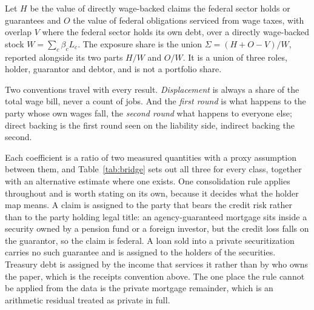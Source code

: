 \begin{definition}
\label{def:exposure}
Let $H$ be the value of directly wage-backed claims the federal sector holds or guarantees and
$O$ the value of federal obligations serviced from wage taxes, with overlap $V$ where the federal
sector holds its own debt, over a directly wage-backed stock $W = \sum_c \beta_c L_c$. The
exposure share is the union $\Sigma = (H + O - V)/W$, reported alongside its two parts $H/W$ and
$O/W$. It is a union of three roles, holder, guarantor and debtor, and is not a portfolio share.
\end{definition}

Two conventions travel with every result. \emph{Displacement} is always a share of the total wage
bill, never a count of jobs. And the \emph{first round} is what happens to the party whose own
wages fall, the \emph{second round} what happens to everyone else; direct backing is the first
round seen on the liability side, indirect backing the second.

\begin{table}[htbp]
\centering
\caption{The thirteen claim classes, levels and labor backing, 2025. Household coefficients are
on the adopted wage basis of Section~\ref{sec:accounts}. Classes marked $\dagger$ are serviced
from business revenue and take zero direct backing under the one-step rule. Measured; the
coverage construction of the same coefficients was rebuilt independently.}
\label{tab:classes}

\end{table}

Each coefficient is a ratio of two measured quantities with a proxy assumption between them, and
Table~\ref{tab:bridge} sets out all three for every class, together with an alternative estimate
where one exists. One consolidation rule applies throughout and is worth stating on its own,
because it decides what the holder map means. A claim is assigned to the party that bears the
credit risk rather than to the party holding legal title: an agency-guaranteed mortgage sits
inside a security owned by a pension fund or a foreign investor, but the credit loss falls on the
guarantor, so the claim is federal. A loan sold into a private securitization carries no such
guarantee and is assigned to the holders of the securities. Treasury debt is assigned by the
income that services it rather than by who owns the paper, which is the receipts convention above.
The one place the rule cannot be applied from the data is the private mortgage remainder, which is
an arithmetic residual treated as private in full.

